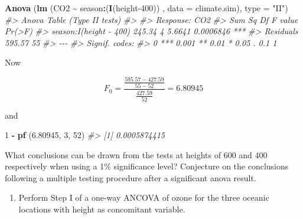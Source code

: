 \documentclass[
]{book}
\newenvironment{Shaded}{\begin{snugshade}}{\end{snugshade}}
\newcommand{\AttributeTok}[1]{\textcolor[rgb]{0.13,0.29,0.53}{#1}}
\newcommand{\CommentTok}[1]{\textcolor[rgb]{0.56,0.35,0.01}{\textit{#1}}}
\newcommand{\DecValTok}[1]{\textcolor[rgb]{0.00,0.00,0.81}{#1}}
\newcommand{\FloatTok}[1]{\textcolor[rgb]{0.00,0.00,0.81}{#1}}
\newcommand{\FunctionTok}[1]{\textcolor[rgb]{0.13,0.29,0.53}{\textbf{#1}}}
\newcommand{\NormalTok}[1]{#1}
\newcommand{\SpecialCharTok}[1]{\textcolor[rgb]{0.81,0.36,0.00}{\textbf{#1}}}
\newcommand{\StringTok}[1]{\textcolor[rgb]{0.31,0.60,0.02}{#1}}
\providecommand{\tightlist}{%
  \setlength{\itemsep}{0pt}\setlength{\parskip}{0pt}}
\begin{document}
\begin{Shaded}
\begin{Highlighting}[]
\FunctionTok{Anova}\NormalTok{ (}\FunctionTok{lm}\NormalTok{ (CO2 }\SpecialCharTok{\textasciitilde{}}\NormalTok{ season}\SpecialCharTok{:}\NormalTok{(}\FunctionTok{I}\NormalTok{(height}\DecValTok{{-}400}\NormalTok{)) , }\AttributeTok{data =}\NormalTok{ climate.sim), }\AttributeTok{type =} \StringTok{"II"}\NormalTok{)}
\CommentTok{\#\textgreater{} Anova Table (Type II tests)}
\CommentTok{\#\textgreater{} }
\CommentTok{\#\textgreater{} Response: CO2}
\CommentTok{\#\textgreater{}                        Sum Sq Df F value    Pr(\textgreater{}F)    }
\CommentTok{\#\textgreater{} season:I(height {-} 400) 245.34  4  5.6641 0.0006846 ***}
\CommentTok{\#\textgreater{} Residuals              595.57 55                      }
\CommentTok{\#\textgreater{} {-}{-}{-}}
\CommentTok{\#\textgreater{} Signif. codes:  }
\CommentTok{\#\textgreater{} 0 \textquotesingle{}***\textquotesingle{} 0.001 \textquotesingle{}**\textquotesingle{} 0.01 \textquotesingle{}*\textquotesingle{} 0.05 \textquotesingle{}.\textquotesingle{} 0.1 \textquotesingle{} \textquotesingle{} 1}
\end{Highlighting}
\end{Shaded}

Now

\[
F_0 = \frac{\frac{595.57 - 427.59}{55-52}}{\frac{427.59}{52}} = 6.80945
\]

and

\begin{Shaded}
\begin{Highlighting}[]
\DecValTok{1} \SpecialCharTok{{-}} \FunctionTok{pf}\NormalTok{ (}\FloatTok{6.80945}\NormalTok{, }\DecValTok{3}\NormalTok{, }\DecValTok{52}\NormalTok{)}
\CommentTok{\#\textgreater{} [1] 0.0005874415}
\end{Highlighting}
\end{Shaded}

What conclusions can be drawn from the tests at heights of 600 and 400 respectively when using a 1\% significance level? Conjecture on the conclusions following a multiple testing procedure after a significant anova result.

\begin{enumerate}
\def\labelenumi{(\alph{enumi})}
\setcounter{enumi}{4}
\tightlist
\item
  Perform Step I of a one-way ANCOVA of ozone for the three oceanic locations with height as concomitant variable.
\end{enumerate}
\end{document}
